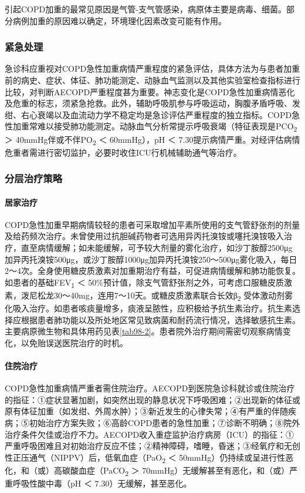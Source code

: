 引起COPD加重的最常见原因是气管-支气管感染，病原体主要是病毒、细菌。部分病例加重的原因难以确定，环境理化因素改变可能有作用。

\subsubsection{紧急处理}

急诊科应重视对COPD急性加重病情严重程度的紧急评估，具体方法为与患者加重前的病史、症状、体征、肺功能测定、动脉血气监测以及其他实验室检查指标进行比较，对判断AECOPD严重程度甚为重要。神志变化是COPD急性加重病情恶化及危重的标志，须紧急抢救。此外，辅助呼吸肌参与呼吸运动，胸腹矛盾呼吸、发绀、右心衰竭以及血流动力学不稳定均是急诊评估严重程度的独立指标。COPD急性加重常难以接受肺功能测定。动脉血气分析常提示呼吸衰竭（特征表现是PCO\textsubscript{2}
＞ 40mmHg伴或不伴PO\textsubscript{2} ＜ 60mmHg），pH ＜
7.30提示病情严重。对经评估病情危重者需进行密切监护，必要时收住ICU行机械辅助通气等治疗。

\subsubsection{分层治疗策略}

\paragraph{居家治疗}

COPD急性加重早期病情较轻的患者可采取增加平素所使用的支气管舒张剂的剂量及给药频次治疗。未曾使用过抗胆碱药物者可选用异丙托溴铵或噻托溴铵吸入治疗，直至病情缓解；如未能缓解，可予较大剂量的雾化治疗，如沙丁胺醇2500μg加异丙托溴铵500μg，或沙丁胺醇1000μg加异丙托溴铵250～500μg雾化吸入，每日2～4次。全身使用糖皮质激素对加重期治疗有益，可促进病情缓解和肺功能恢复。如患者的基础FEV\textsubscript{1}
＜
50\%预计值，除支气管舒张剂之外，可考虑口服糖皮质激素，泼尼松龙30～40mg，连用7～10天。或糖皮质激素联合长效β\textsubscript{2}
受体激动剂雾化吸入治疗。如患者咳痰量增多，痰液呈脓性，应积极给予抗生素治疗。抗生素选择应根据患者肺功能以及所处地区常见致病菌和耐药流行情况，选择敏感抗生素。主要病原微生物和具体用药见表\ref{tab98-2}。患者院外治疗期间需密切观察病情变化，以免贻误送医院治疗的时机。

\paragraph{住院治疗}

COPD急性加重病情严重者需住院治疗。AECOPD到医院急诊科就诊或住院治疗的指征：①症状显著加剧，如突然出现的静息状况下呼吸困难；②出现新的体征或原有体征加重（如发绀、外周水肿）；③新近发生的心律失常；④有严重的伴随疾病；⑤初始治疗方案失败；⑥高龄COPD患者的急性加重；⑦诊断不明确；⑧院外治疗条件欠佳或治疗不力。AECOPD收入重症监护治疗病房（ICU）的指征：①严重呼吸困难且对初始治疗反应不佳；②精神障碍，嗜睡，昏迷；③经氧疗和无创性正压通气（NIPPV）后，低氧血症（PaO\textsubscript{2}
＜
50mmHg）仍持续或呈进行性恶化，和（或）高碳酸血症（PaCO\textsubscript{2}
＞ 70mmHg）无缓解甚至有恶化，和（或）严重呼吸性酸中毒（pH ＜
7.30）无缓解，甚至恶化。

